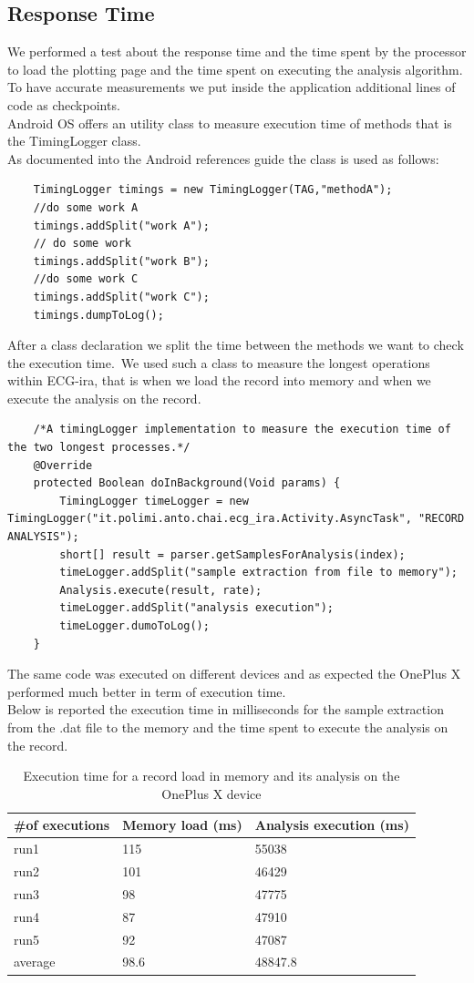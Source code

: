 \subsection{Response Time}
We performed a test about the response  time and the time spent by the processor to load the plotting page and the time spent on executing the analysis algorithm.\\
To have accurate measurements we put inside the application additional lines of code as checkpoints.\\
Android OS offers an utility class to measure execution time of methods that is the TimingLogger class.\\
As documented into the Android references guide the class is used as follows:
\begin{lstlisting}
	TimingLogger timings = new TimingLogger(TAG,"methodA");
	//do some work A
	timings.addSplit("work A");
	// do some work 
	timings.addSplit("work B");
	//do some work C
	timings.addSplit("work C");
	timings.dumpToLog();
\end{lstlisting}
After a class declaration we split the time between the methods we want to check the execution time.\
We used such a class to measure the longest operations within ECG-ira, that is when we load the record into memory and when we execute the analysis on the record.
\begin{lstlisting}
	/*A timingLogger implementation to measure the execution time of the two longest processes.*/
	@Override
	protected Boolean doInBackground(Void params) {
		TimingLogger timeLogger = new TimingLogger("it.polimi.anto.chai.ecg_ira.Activity.AsyncTask", "RECORD ANALYSIS");
		short[] result = parser.getSamplesForAnalysis(index);
		timeLogger.addSplit("sample extraction from file to memory");
		Analysis.execute(result, rate);
		timeLogger.addSplit("analysis execution");
		timeLogger.dumoToLog();
	}
\end{lstlisting}
The same code was executed on different devices and as expected the OnePlus X performed much better in term of execution time.\\
Below is reported the execution time in milliseconds for the sample extraction from the .dat file to the memory and the time spent to execute the analysis on the record.\\
\begin{table}[h]
\begin{tabularx}{\textwidth}{|X|X|X|}
	\hline
	\textbf{\#of executions} & \textbf{Memory load (ms)} &\textbf{Analysis execution (ms)}  \\ \hline
	run1 & 115 & 55038  \\ \hline
	run2 & 101 & 46429 \\ \hline
	run3 & 98 & 47775 \\ \hline
	run4 & 87 & 47910 \\ \hline
	run5 & 92 & 47087 \\ \hline
	average & 98.6 & 48847.8 \\ \hline
	
\end{tabularx}
\caption{Execution time for a record load in memory and its analysis on the OnePlus X device}
\label{tab10.2}
\end{table}
